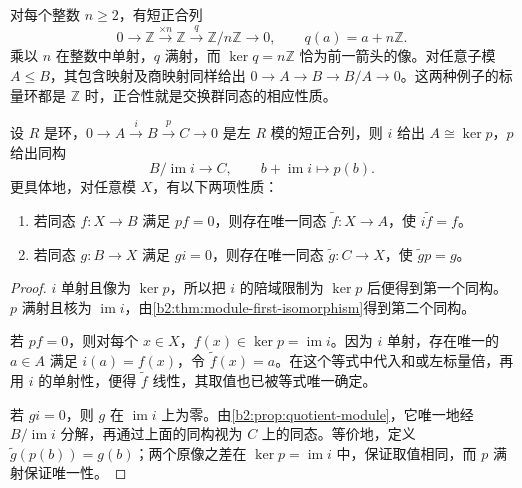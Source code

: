 \ProseParagraphBreak
对每个整数 \(n\ge2\)，有短正合列
\begin{equation}\label{b2:eq:integer-short-exact}
	0\longrightarrow\mathbb Z\xrightarrow{\times n}\mathbb Z \xrightarrow{q}\mathbb Z/n\mathbb Z\longrightarrow0, \qquad q(a)=a+n\mathbb Z.
\end{equation}
乘以 \(n\) 在整数中单射，\(q\) 满射，而 \(\ker q=n\mathbb Z\) 恰为前一箭头的像。对任意子模 \(A\le B\)，其包含映射及商映射同样给出 \(0\to A\to B\to B/A\to0\)。这两种例子的标量环都是 \(\mathbb Z\) 时，正合性就是交换群同态的相应性质。

\begin{proposition}[短正合列中的核与余核]\label{b2:prop:short-exact-kernel-cokernel}
	设 \(R\) 是环，\(0\to A\xrightarrow{i}B\xrightarrow{p}C\to0\) 是左 \(R\) 模的短正合列，则 \(i\) 给出 \(A\cong\ker p\)，\(p\) 给出同构
	\[
		B/\operatorname{im}i\longrightarrow C, \qquad b+\operatorname{im}i\longmapsto p(b).
	\]
	更具体地，对任意模 \(X\)，有以下两项性质：
	\begin{enumerate}
		\item 若同态 \(f:X\to B\) 满足 \(pf=0\)，则存在唯一同态 \(\widetilde f:X\to A\)，使 \(i\widetilde f=f\)。
		\item 若同态 \(g:B\to X\) 满足 \(gi=0\)，则存在唯一同态 \(\widetilde g:C\to X\)，使 \(\widetilde g p=g\)。
	\end{enumerate}
\end{proposition}

\begin{proof}
	\(i\) 单射且像为 \(\ker p\)，所以把 \(i\) 的陪域限制为 \(\ker p\) 后便得到第一个同构。\(p\) 满射且核为 \(\operatorname{im}i\)，由\cref{b2:thm:module-first-isomorphism}得到第二个同构。

	若 \(pf=0\)，则对每个 \(x\in X\)，\(f(x)\in\ker p=\operatorname{im}i\)。因为 \(i\) 单射，存在唯一的 \(a\in A\) 满足 \(i(a)=f(x)\)，令 \(\widetilde f(x)=a\)。在这个等式中代入和或左标量倍，再用 \(i\) 的单射性，便得 \(\widetilde f\) 线性，其取值也已被等式唯一确定。

	若 \(gi=0\)，则 \(g\) 在 \(\operatorname{im}i\) 上为零。由\cref{b2:prop:quotient-module}，它唯一地经 \(B/\operatorname{im}i\) 分解，再通过上面的同构视为 \(C\) 上的同态。等价地，定义 \(\widetilde g(p(b))=g(b)\)；两个原像之差在 \(\ker p=\operatorname{im}i\) 中，保证取值相同，而 \(p\) 满射保证唯一性。
\end{proof}

